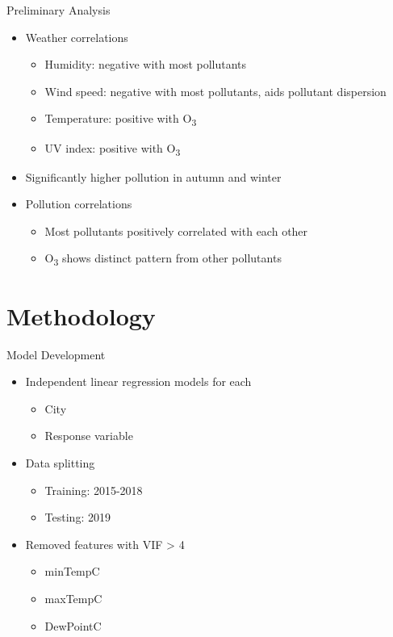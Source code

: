 \documentclass[svgnames, 12pt]{beamer}
\begin{document}
\begin{frame}{Preliminary Analysis}
    \begin{itemize}
       \item Weather correlations
           \begin{itemize}
               \item Humidity: negative with most pollutants
               \item Wind speed: negative with most pollutants, aids pollutant dispersion
               \item Temperature: positive with O\textsubscript{3}
               \item UV index: positive with O\textsubscript{3}
           \end{itemize}
       \item Significantly higher pollution in autumn and winter
       \item Pollution correlations
           \begin{itemize}
               \item Most pollutants positively correlated with each other
               \item O\textsubscript{3} shows distinct pattern from other pollutants
           \end{itemize}
    \end{itemize}
\end{frame}

\section{Methodology}

\begin{frame}{Model Development}
\begin{itemize}
    \item Independent linear regression models for each
        \begin{itemize}
            \item City
            \item Response variable
        \end{itemize}
    \item Data splitting
        \begin{itemize}
            \item Training: 2015-2018
            \item Testing: 2019
        \end{itemize}
    \item Removed features with VIF > 4
        \begin{itemize}
            \item minTempC
            \item maxTempC
            \item DewPointC
        \end{itemize}
\end{itemize}
\end{frame}
\end{document}
